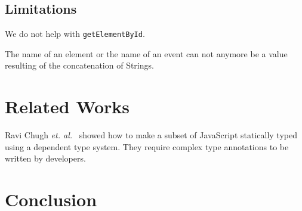 \documentclass{llncs}
\newcommand{\jscode}[1]{\lstinline[language=JavaScript]|#1|}
\begin{document}
\subsection{Limitations}

We do not help with \jscode{getElementById}.

The name of an element or the name of an event can not anymore be a value resulting of the concatenation of Strings.

\section{Related Works}
\label{sec-related}

Ravi Chugh \emph{et. al.}~\cite{Chugh12_DJS} showed how to make a subset of JavaScript statically typed using a dependent type system. They require complex type annotations to be written by developers.

\section{Conclusion}
\label{sec-conclusion}



\end{document}

